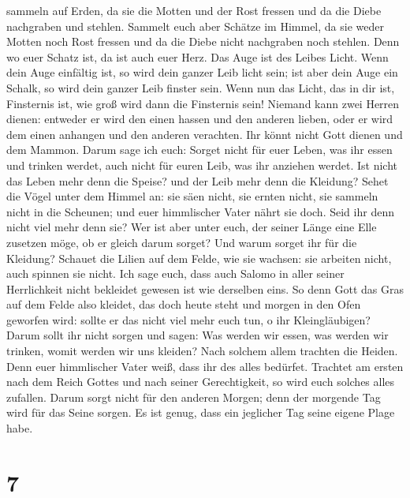 sammeln auf Erden, da sie die Motten und der Rost fressen und da die
Diebe nachgraben und stehlen.  Sammelt euch aber Schätze
im Himmel, da sie weder Motten noch Rost fressen und da die Diebe nicht
nachgraben noch stehlen.  Denn wo euer Schatz ist, da ist
auch euer Herz.  Das Auge ist des Leibes Licht. Wenn dein
Auge einfältig ist, so wird dein ganzer Leib licht sein; 
ist aber dein Auge ein Schalk, so wird dein ganzer Leib finster sein.
Wenn nun das Licht, das in dir ist, Finsternis ist, wie groß wird dann
die Finsternis sein!  Niemand kann zwei Herren dienen:
entweder er wird den einen hassen und den anderen lieben, oder er wird
dem einen anhangen und den anderen verachten. Ihr könnt nicht Gott
dienen und dem Mammon.  Darum sage ich euch: Sorget nicht
für euer Leben, was ihr essen und trinken werdet, auch nicht für euren
Leib, was ihr anziehen werdet. Ist nicht das Leben mehr denn die Speise?
und der Leib mehr denn die Kleidung?  Sehet die Vögel
unter dem Himmel an: sie säen nicht, sie ernten nicht, sie sammeln nicht
in die Scheunen; und euer himmlischer Vater nährt sie doch. Seid ihr
denn nicht viel mehr denn sie?  Wer ist aber unter euch,
der seiner Länge eine Elle zusetzen möge, ob er gleich darum sorget?
 Und warum sorget ihr für die Kleidung? Schauet die
Lilien auf dem Felde, wie sie wachsen: sie arbeiten nicht, auch spinnen
sie nicht.  Ich sage euch, dass auch Salomo in aller
seiner Herrlichkeit nicht bekleidet gewesen ist wie derselben eins.
 So denn Gott das Gras auf dem Felde also kleidet, das
doch heute steht und morgen in den Ofen geworfen wird: sollte er das
nicht viel mehr euch tun, o ihr Kleingläubigen?  Darum
sollt ihr nicht sorgen und sagen: Was werden wir essen, was werden wir
trinken, womit werden wir uns kleiden?  Nach solchem
allem trachten die Heiden. Denn euer himmlischer Vater weiß, dass ihr
des alles bedürfet.  Trachtet am ersten nach dem Reich
Gottes und nach seiner Gerechtigkeit, so wird euch solches alles
zufallen.  Darum sorgt nicht für den anderen Morgen; denn
der morgende Tag wird für das Seine sorgen. Es ist genug, dass ein
jeglicher Tag seine eigene Plage habe.

\hypertarget{section-6}{%
\section{7}\label{section-6}}

